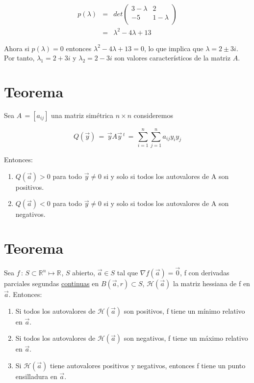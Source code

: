 \documentclass[12pt]{article}
\newcommand{\teorema}{\section{Teorema}}
\newcommand{\Rn}[1]{\mathbb{R}^{#1}}
\begin{document}
    \begin{eqnarray*}
        p(\lambda) & = & det  \begin{pmatrix}
            3 - \lambda & 2 \\
            -5 & 1 -\lambda \\
            \end{pmatrix}  \\[0.2 cm]
                & = & \lambda ^{2} -4 \lambda +13
    \end{eqnarray*}

Ahora si $p(\lambda) = 0$ entonces $\lambda ^{2} -4 \lambda +13 = 0$, lo que implica que $\lambda = 2 \pm 3i$. Por tanto, $\lambda_{1} = 2 + 3i$ y $\lambda_{2} = 2 - 3i$ son valores característicos de la matriz $A$.
	
	\teorema
	Sea $A \, = [a_{ij}]$ una matriz simétrica $n \times n$ consideremos 
	
	$$ Q(\vec{y}) \, = \, \vec{y} A \vec{y} \, ^{t} \, = \, \sum _{i = 1} ^{n} \sum _{j = 1} ^{n} a_{ij} y_{i} y_{j}$$
	
	Entonces:
	
	\begin{enumerate}
	    \item $Q(\vec{a}) > 0$ para todo $ \vec{y} \neq 0$ si y solo si todos los autovalores de A son positivos.
	    
	    \item  $Q(\vec{a}) < 0$ para todo $ \vec{y} \neq 0$ si y solo si todos los autovalores de A son negativos.
	\end{enumerate}
	
	
	\teorema

	Sea $f \, : \, S \subset \Rn{n} \mapsto \Rn{}$, $S$ abierto, $\vec{a} \in S$ tal que $\nabla f(\vec{a}) = \vec{0}$, f con derivadas parciales segundas \underline{continuas} en $B(\vec{a}, r) \subset S$, $\mathscr{H} (\vec{a})$ la matriz hessiana de f en $\vec{a}.$ Entonces:
	
	\begin{enumerate}
	    \item Si todos los autovalores de $\mathscr{H} (\vec{a})$ son positivos, f tiene un mínimo relativo en $\vec{a}$.
	    
	    \item Si todos los autovalores de $\mathscr{H} (\vec{a})$ son negativos, f tiene un máximo relativo en $\vec{a}$.
	    
	    \item Si $\mathscr{H} (\vec{a})$ tiene autovalores positivos y negativos, entonces f tiene un punto ensilladura en $\vec{a}$.
	    
	\end{enumerate}
	
	
	
	
	

	
    
    
    
	
	
\end{document}
